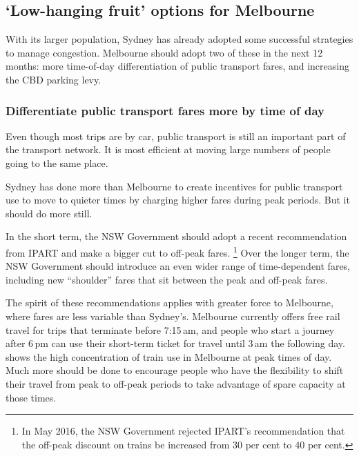 \documentclass{grattan}
\begin{document}
\subsection{`Low-hanging fruit' options for Melbourne}
With its larger population, Sydney has already adopted some successful strategies to manage congestion. Melbourne should adopt two of these in the next 12 months: more time-of-day differentiation of public transport fares, and increasing the CBD parking levy.
\subsubsection{Differentiate public transport fares more by time of day}

Even though most trips are by car, public transport is still an important part of the transport network.
It is most efficient at moving large numbers of people going to the same place.

Sydney has done more than Melbourne to create incentives for public transport use to move to quieter times by charging higher fares during peak periods.
But it should do more still.

In the short term, the NSW Government should adopt a recent recommendation from IPART and make a bigger cut to off-peak fares.%
    \footnote{In May 2016, the NSW Government rejected IPART's recommendation that the off-peak discount on trains be increased from 30 per cent to 40 per cent.}
Over the longer term, the NSW Government should introduce an even wider range of time-dependent fares, including new ``shoulder'' fares that sit between the peak and off-peak fares.

The spirit of these recommendations applies with greater force to Melbourne, where fares are less variable than Sydney's.
Melbourne currently offers free rail travel for trips that terminate before 7:15\,am, and people who start a journey after 6\,pm can use their short-term ticket for travel until 3\,am the following day.
 shows the high concentration of train use in Melbourne at peak times of day. Much more should be done to encourage people who have the flexibility to shift their travel from peak to off-peak periods to take advantage of spare capacity at those times. 
\end{document}
